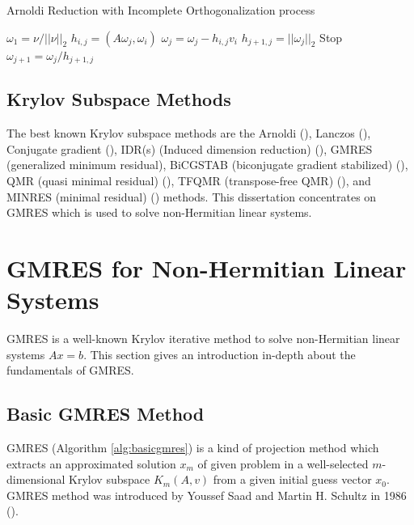 \begin{algorithm}[t]{}
	\caption{Arnoldi Reduction with Incomplete Orthogonalization process}   
	\label{alg:arnoldi-incomplete-reduction}   
	\begin{algorithmic}[1]
		\State $\omega_1=\nu /||\nu||_2$
		\State $h_{i,j}=(A\omega_j,\omega_i)$
		\State $\omega_j=\omega_j-h_{i,j}v_i$
		\EndFor
		\State $h_{j+1,j}=||\omega_j||_2$
		 Stop
		\EndIf
		\State $\omega_{j+1}=\omega_j/h_{j+1,j}$
		\EndFor 
		\EndFunction
	\end{algorithmic}  
\end{algorithm}

\subsection{Krylov Subspace Methods}

The best known Krylov subspace methods are the Arnoldi (\cite{voss2004arnoldi}), Lanczos (\cite{widlund1978lanczos}), Conjugate gradient (\cite{lasdon1967conjugate}), IDR(s) (Induced dimension reduction) (\cite{van2015induced}), GMRES (generalized minimum residual), BiCGSTAB (biconjugate gradient stabilized) (\cite{sleijpen1993bicgstab}), QMR (quasi minimal residual) (\cite{freund1991qmr}), TFQMR (transpose-free QMR) (\cite{basermann1996qmr}), and MINRES (minimal residual) (\cite{paige1975solution}) methods. This dissertation concentrates on GMRES which is used to solve non-Hermitian linear systems.

\section{GMRES for Non-Hermitian Linear Systems}

GMRES is a well-known Krylov iterative method to solve non-Hermitian linear systems $Ax=b$. This section gives an introduction in-depth about the fundamentals of GMRES.

\subsection{Basic GMRES Method}

GMRES (Algorithm \ref{alg:basicgmres}) is a kind of projection method which extracts an approximated solution $x_m$ of given problem in a well-selected $m$-dimensional Krylov subspace \(K_m(A,v)\) from a given initial guess vector $x_0$.  GMRES method was introduced by Youssef Saad and Martin H. Schultz in 1986 (\cite{saad1986gmres}).

